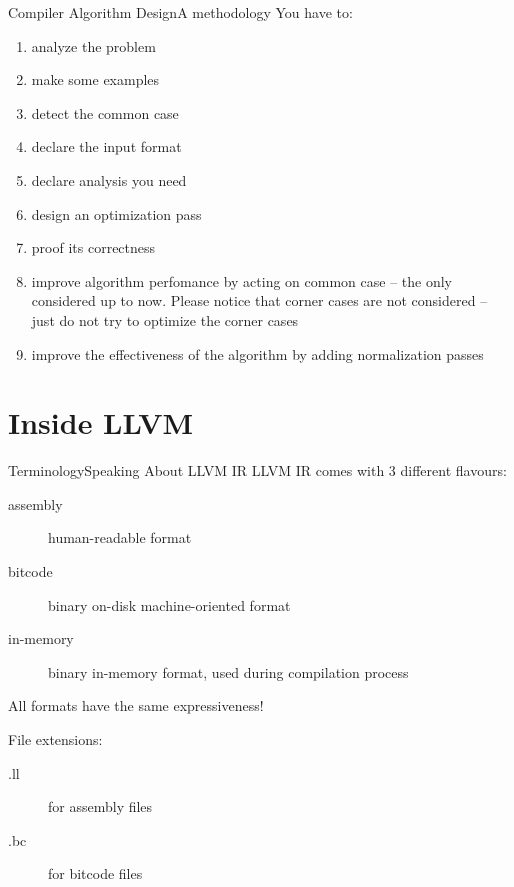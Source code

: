 \documentclass[10pt,mathserif]{beamer}
\begin{document}
\begin{frame}{Compiler Algorithm Design}{A methodology}
You have to:

\begin{enumerate}
\item analyze the problem
\item make some examples
\item detect the common case
\item declare the \alert{input format}
\item declare \alert{analysis} you need
\item design an \alert{optimization} pass
\item proof its \alert{correctness}
\item improve algorithm perfomance by acting on common case -- the only
      considered up to now. Please notice that corner cases are not considered
      -- just do not try to optimize the corner cases
\item improve the effectiveness of the algorithm by adding
      \alert{normalization passes}
\end{enumerate}
\end{frame}

\section{Inside LLVM}
\begin{frame}{Terminology}{Speaking About LLVM IR}
LLVM IR comes with 3 different flavours:

\begin{description}
\item[assembly] human-readable format
\item[bitcode] binary on-disk machine-oriented format
\item[in-memory] binary in-memory format, used during compilation process
\end{description}

All formats have the same expressiveness!

\vfill
File extensions:

\begin{description}
\item[.ll] for assembly files
\item[.bc] for bitcode files
\end{description}
\end{frame}
\end{document}
